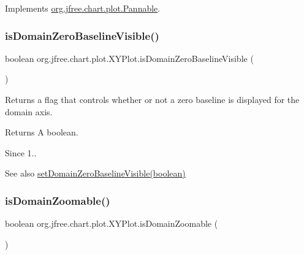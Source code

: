 Implements \mbox{\hyperlink{interfaceorg_1_1jfree_1_1chart_1_1plot_1_1_pannable_a732908d75e7c0b1fab688d9a29ff3e44}{org.\+jfree.\+chart.\+plot.\+Pannable}}.

\mbox{\label{classorg_1_1jfree_1_1chart_1_1plot_1_1_x_y_plot_aab7624f32aa6785f5d6b25c68f35e489}} 
\subsubsection{\texorpdfstring{is\+Domain\+Zero\+Baseline\+Visible()}{isDomainZeroBaselineVisible()}}
{\footnotesize\ttfamily boolean org.\+jfree.\+chart.\+plot.\+X\+Y\+Plot.\+is\+Domain\+Zero\+Baseline\+Visible (\begin{DoxyParamCaption}{ }\end{DoxyParamCaption})}

Returns a flag that controls whether or not a zero baseline is displayed for the domain axis.

\begin{DoxyReturn}{Returns}
A boolean.
\end{DoxyReturn}
\begin{DoxySince}{Since}
1..
\end{DoxySince}
\begin{DoxySeeAlso}{See also}
\mbox{\hyperlink{classorg_1_1jfree_1_1chart_1_1plot_1_1_x_y_plot_ac7550f7b8a62959de2654cfe50970e36}{set\+Domain\+Zero\+Baseline\+Visible(boolean)}} 
\end{DoxySeeAlso}
\mbox{\label{classorg_1_1jfree_1_1chart_1_1plot_1_1_x_y_plot_a5f49e32b31451203cae07ffee7cab4db}} 
\subsubsection{\texorpdfstring{is\+Domain\+Zoomable()}{isDomainZoomable()}}
{\footnotesize\ttfamily boolean org.\+jfree.\+chart.\+plot.\+X\+Y\+Plot.\+is\+Domain\+Zoomable (\begin{DoxyParamCaption}{ }\end{DoxyParamCaption})}

